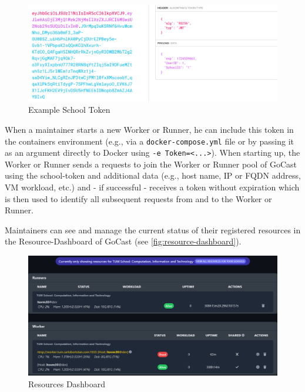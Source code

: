 \begin{figure}[htpb]
    \centering
    \includegraphics[width=390pt]{images/SchoolToken.png}
    \caption[Example School Token]{Example School Token}\label{fig:school-token}
\end{figure}

When a maintainer starts a new Worker or Runner, he can include this token in the containers environment (e.g., via a \texttt{docker-compose.yml} file or by passing it as an argument directly to Docker using \texttt{-e Token=<...>}). When starting up, the Worker or Runner sends a requests to join the Worker or Runner pool of GoCast using the school-token and additional data (e.g., host name, IP or FQDN address, \ac{VM} workload, etc.) and - if successful - receives a token without expiration which is then used to identify all subsequent requests from and to the Worker or Runner.  

Maintainers can see and manage the current status of their registered resources in the Resource-Dashboard of GoCast (see \autoref{fig:resource-dashboard}).

\begin{figure}[htpb]
    \centering
    \includegraphics[width=390pt]{images/ResourceDashboard.png}
    \caption[Resources Dashboard]{Resources Dashboard}\label{fig:resource-dashboard}
\end{figure}

